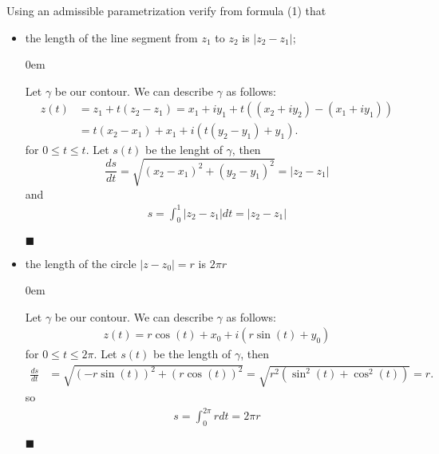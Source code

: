 \documentclass[12pt]{article}
\renewcommand{\qed}{\hfill$\blacksquare$}
\renewenvironment{proof}{\vspace{1em}\begin{addmargin}[2em]{0em}\begin{newproof}}{\end{newproof}\end{addmargin}\qed}
\newenvironment{exercise}[2][Exercise]{\begin{trivlist}
\item[\hskip \labelsep {\bfseries #1} \hskip \labelsep {\bfseries #2.}]}{\end{trivlist}}
\begin{document}
\begin{exercise}{10}
	Using an admissible parametrization verify from formula (1) that
	\begin{itemize}
		\item[(a)] the length of the line segment from $z_1$ to $z_2$ is $|z_2 - z_1|$;
			\begin{proof}
				Let $\gamma$ be our contour. We can describe $\gamma$ as follows:
				\begin{align*}
					z(t) &= z_1 + t(z_2 - z_1) = x_1 + iy_1 + t((x_2 + iy_2) - (x_1 + iy_1)) \\
					     &= t(x_2 - x_1) + x_1 + i(t(y_2 - y_1) + y_1).
				\end{align*}
				for $0 \le t \le t$. Let $s(t)$ be the lenght of $\gamma$, then
				\[
					\frac{ds}{dt} = \sqrt{(x_2 - x_1)^2 + (y_2 - y_1)^2} = |z_2 - z_1|
				\]
				and
				\begin{align*}
					s = \int_{0}^{1} |z_2 - z_1| dt = |z_2 - z_1|
				\end{align*}
			\end{proof}
		\item[(b)] the length of the circle $|z - z_0| = r$ is $2\pi r$
			\begin{proof}
				Let $\gamma$ be our contour. We can describe $\gamma$ as follows:
				\begin{align*}
					z(t) = r\cos(t) + x_0 + i(r\sin(t) + y_0)
				\end{align*}
				for $0 \le t \le 2\pi$. Let $s(t)$ be the length of $\gamma$, then
				\begin{align*}
					\frac{ds}{dt} &= \sqrt{(-r\sin(t))^2 + (r\cos(t))^2} = \sqrt{r^2(\sin^2(t) + \cos^2(t))} = r.
				\end{align*}
				so
				\begin{align*}
					s = \int_{0}^{2\pi}rdt = 2\pi r
				\end{align*}
			\end{proof}
	\end{itemize}
\end{exercise}
\end{document}
